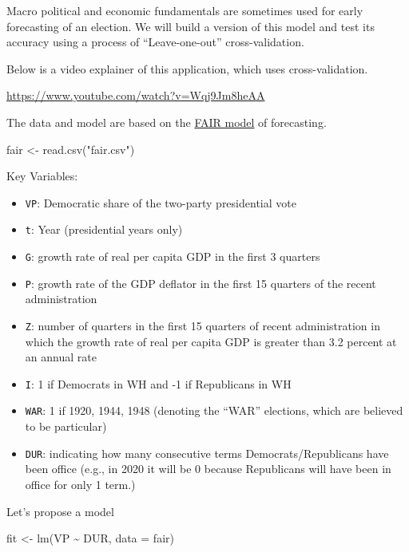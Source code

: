 \documentclass[
  letterpaper,
  DIV=11,
  numbers=noendperiod]{scrreprt}
\newenvironment{Shaded}{\begin{snugshade}}{\end{snugshade}}
\newcommand{\AttributeTok}[1]{\textcolor[rgb]{0.40,0.45,0.13}{#1}}
\newcommand{\FunctionTok}[1]{\textcolor[rgb]{0.28,0.35,0.67}{#1}}
\newcommand{\NormalTok}[1]{\textcolor[rgb]{0.00,0.23,0.31}{#1}}
\newcommand{\OtherTok}[1]{\textcolor[rgb]{0.00,0.23,0.31}{#1}}
\newcommand{\SpecialCharTok}[1]{\textcolor[rgb]{0.37,0.37,0.37}{#1}}
\newcommand{\StringTok}[1]{\textcolor[rgb]{0.13,0.47,0.30}{#1}}
\providecommand{\tightlist}{%
  \setlength{\itemsep}{0pt}\setlength{\parskip}{0pt}}\usepackage{longtable,booktabs,array}
\begin{document}
Macro political and economic fundamentals are sometimes used for early
forecasting of an election. We will build a version of this model and
test its accuracy using a process of ``Leave-one-out'' cross-validation.

Below is a video explainer of this application, which uses
cross-validation.

\url{https://www.youtube.com/watch?v=Wqj9Jm8heAA}

The data and model are based on the
\href{Based\%20on\%20the\%20FAIR\%20model\%20for\%20forecasting\%20elections\%20/url\%7Bhttps://fairmodel.econ.yale.edu/vote2016/computev.htm\%7D}{FAIR
model} of forecasting.

\begin{Shaded}
\begin{Highlighting}[]
\NormalTok{fair }\OtherTok{\textless{}{-}} \FunctionTok{read.csv}\NormalTok{(}\StringTok{"fair.csv"}\NormalTok{)}
\end{Highlighting}
\end{Shaded}

Key Variables:

\begin{itemize}
\tightlist
\item
  \texttt{VP}: Democratic share of the two-party presidential vote
\item
  \texttt{t}: Year (presidential years only)
\item
  \texttt{G}: growth rate of real per capita GDP in the first 3 quarters
\item
  \texttt{P}: growth rate of the GDP deflator in the first 15 quarters
  of the recent administration
\item
  \texttt{Z}: number of quarters in the first 15 quarters of recent
  administration in which the growth rate of real per capita GDP is
  greater than 3.2 percent at an annual rate
\item
  \texttt{I}: 1 if Democrats in WH and -1 if Republicans in WH
\item
  \texttt{WAR}: 1 if 1920, 1944, 1948 (denoting the ``WAR'' elections,
  which are believed to be particular)
\item
  \texttt{DUR}: indicating how many consecutive terms
  Democrats/Republicans have been office (e.g., in 2020 it will be 0
  because Republicans will have been in office for only 1 term.)
\end{itemize}

Let's propose a model

\begin{Shaded}
\begin{Highlighting}[]
\NormalTok{fit }\OtherTok{\textless{}{-}} \FunctionTok{lm}\NormalTok{(VP }\SpecialCharTok{\textasciitilde{}}\NormalTok{ DUR, }\AttributeTok{data =}\NormalTok{ fair)}
\end{Highlighting}
\end{Shaded}
\end{document}
